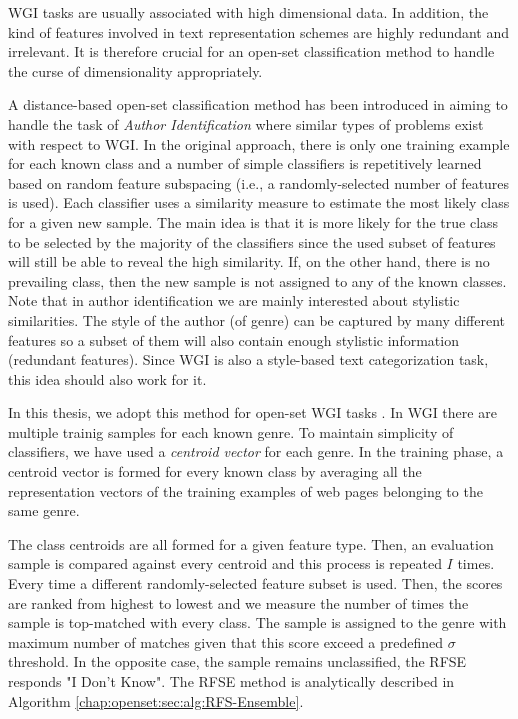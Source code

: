 WGI tasks are usually associated with high dimensional data. In addition, the kind of features involved in text representation schemes are highly redundant and irrelevant. It is therefore crucial for an open-set classification method to handle the curse of dimensionality appropriately.

A distance-based open-set classification method has been introduced in \parencite{koppel2011authorship} aiming to handle the task of \textit{Author Identification} where similar types of problems exist with respect to WGI. In the original approach, there is only one training example for each known class and a number of simple classifiers is repetitively learned based on random feature subspacing (i.e., a randomly-selected number of features is used). Each classifier uses a similarity measure to estimate the most likely class for a given new sample. The main idea is that it is more likely for the true class to be selected by the majority of the classifiers since the used subset of features will still be able to reveal the high similarity. If, on the other hand, there is no prevailing class, then the new sample is not assigned to any of the known classes. Note that in author identification we are mainly interested about stylistic similarities. The style of the author (of genre) can be captured by many different features so a subset of them will also contain enough stylistic information (redundant features). Since WGI is also a style-based text categorization task, this idea should also work for it.

In this thesis, we adopt this method for open-set WGI tasks \parencite{pritsos2013open}. In WGI there are multiple trainig samples for each known genre. To maintain simplicity of classifiers, we have used a \textit{centroid vector} for each genre. In the training phase, a centroid vector is formed for every known class by averaging all the representation vectors of the training examples of web pages belonging to the same genre.

The class centroids are all formed for a given feature type. Then, an evaluation sample is compared against every centroid and this process is repeated $I$ times. Every time a different randomly-selected feature subset is used. Then, the scores are ranked from highest to lowest and we measure the number of times the sample is top-matched with every class. The sample is assigned to the genre with maximum number of matches given that this score exceed a predefined $\sigma$ threshold. In the opposite case, the sample remains unclassified, the RFSE responds "I Don't Know". The RFSE method is analytically described in Algorithm \ref{chap:openset:sec:alg:RFS-Ensemble}. 

